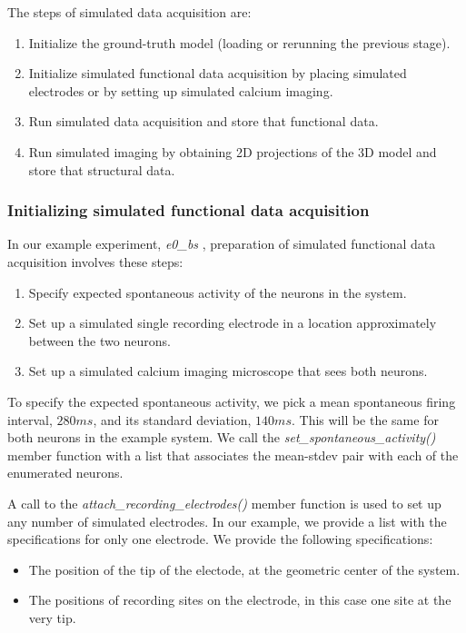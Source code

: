 \documentclass{ldr-article}
\def\firstexp{\textit{e0\_bs} }
\begin{document}
The steps of simulated data acquisition are:
\begin{enumerate}
	\item Initialize the ground-truth model (loading or rerunning the previous stage).
	\item Initialize simulated functional data acquisition by placing simulated electrodes or by setting up simulated calcium imaging.
	\item Run simulated data acquisition and store that functional data.
	\item Run simulated imaging by obtaining 2D projections of the 3D model and store that structural data.
\end{enumerate}

\subsubsection{Initializing simulated functional data acquisition}

In our example experiment, \firstexp, preparation of simulated functional data acquisition involves these steps:
\begin{enumerate}
	\item Specify expected spontaneous activity of the neurons in the system.
	\item Set up a simulated single recording electrode in a location approximately between the two neurons.
	\item Set up a simulated calcium imaging microscope that sees both neurons.
\end{enumerate}

To specify the expected spontaneous activity, we pick a mean spontaneous firing interval, $280 ms$, and its standard deviation, $140 ms$. This will be the same for both neurons in the example system. We call the \textit{set\_spontaneous\_activity()} member function with a list that associates the mean-stdev pair with each of the enumerated neurons.

A call to the \textit{attach\_recording\_electrodes()} member function is used to set up any number of simulated electrodes. In our example, we provide a list with the specifications for only one electrode. We provide the following specifications:
\begin{itemize}
	\item The position of the tip of the electode, at the geometric center of the system.
	\item The positions of recording sites on the electrode, in this case one site at the very tip.
\end{itemize}
\end{document}
